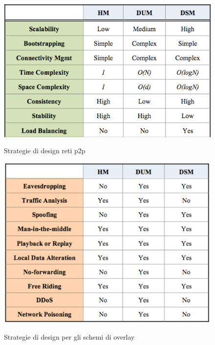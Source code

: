 \begin{figure}[h!]
    \centering
    \includegraphics[width=0.8\linewidth]{imgs/6 - strategie di design p2p.png}
    \label{fig:designStrategiesP2p}
    \caption{Strategie di design reti p2p}
\end{figure}

\begin{figure}[h!]
    \centering
    \includegraphics[width=0.8\linewidth]{imgs/7 - overlay design.png}
    \label{fig:designOverlayP2p}
    \caption{Strategie di design per gli schemi di overlay}
\end{figure}

